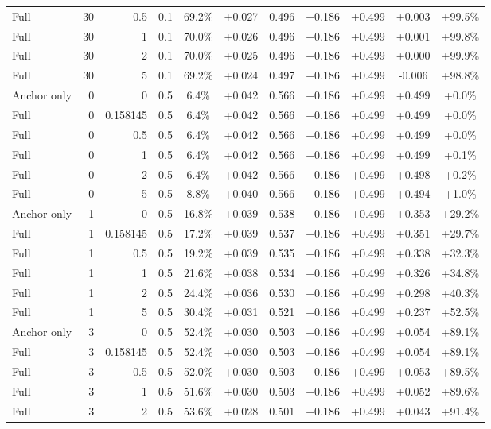 \begin{table}[htbp]
\begin{tabular}{lrrrccccccc}
Full & 30 & 0.5 & 0.1 & 69.2\% & +0.027 & 0.496 & +0.186 & +0.499 & +0.003 & +99.5\% \\
Full & 30 & 1 & 0.1 & 70.0\% & +0.026 & 0.496 & +0.186 & +0.499 & +0.001 & +99.8\% \\
Full & 30 & 2 & 0.1 & 70.0\% & +0.025 & 0.496 & +0.186 & +0.499 & +0.000 & +99.9\% \\
Full & 30 & 5 & 0.1 & 69.2\% & +0.024 & 0.497 & +0.186 & +0.499 & -0.006 & +98.8\% \\
Anchor only & 0 & 0 & 0.5 & 6.4\% & +0.042 & 0.566 & +0.186 & +0.499 & +0.499 & +0.0\% \\
Full & 0 & 0.158145 & 0.5 & 6.4\% & +0.042 & 0.566 & +0.186 & +0.499 & +0.499 & +0.0\% \\
Full & 0 & 0.5 & 0.5 & 6.4\% & +0.042 & 0.566 & +0.186 & +0.499 & +0.499 & +0.0\% \\
Full & 0 & 1 & 0.5 & 6.4\% & +0.042 & 0.566 & +0.186 & +0.499 & +0.499 & +0.1\% \\
Full & 0 & 2 & 0.5 & 6.4\% & +0.042 & 0.566 & +0.186 & +0.499 & +0.498 & +0.2\% \\
Full & 0 & 5 & 0.5 & 8.8\% & +0.040 & 0.566 & +0.186 & +0.499 & +0.494 & +1.0\% \\
Anchor only & 1 & 0 & 0.5 & 16.8\% & +0.039 & 0.538 & +0.186 & +0.499 & +0.353 & +29.2\% \\
Full & 1 & 0.158145 & 0.5 & 17.2\% & +0.039 & 0.537 & +0.186 & +0.499 & +0.351 & +29.7\% \\
Full & 1 & 0.5 & 0.5 & 19.2\% & +0.039 & 0.535 & +0.186 & +0.499 & +0.338 & +32.3\% \\
Full & 1 & 1 & 0.5 & 21.6\% & +0.038 & 0.534 & +0.186 & +0.499 & +0.326 & +34.8\% \\
Full & 1 & 2 & 0.5 & 24.4\% & +0.036 & 0.530 & +0.186 & +0.499 & +0.298 & +40.3\% \\
Full & 1 & 5 & 0.5 & 30.4\% & +0.031 & 0.521 & +0.186 & +0.499 & +0.237 & +52.5\% \\
Anchor only & 3 & 0 & 0.5 & 52.4\% & +0.030 & 0.503 & +0.186 & +0.499 & +0.054 & +89.1\% \\
Full & 3 & 0.158145 & 0.5 & 52.4\% & +0.030 & 0.503 & +0.186 & +0.499 & +0.054 & +89.1\% \\
Full & 3 & 0.5 & 0.5 & 52.0\% & +0.030 & 0.503 & +0.186 & +0.499 & +0.053 & +89.5\% \\
Full & 3 & 1 & 0.5 & 51.6\% & +0.030 & 0.503 & +0.186 & +0.499 & +0.052 & +89.6\% \\
Full & 3 & 2 & 0.5 & 53.6\% & +0.028 & 0.501 & +0.186 & +0.499 & +0.043 & +91.4\% \\

\end{tabular}
\end{table}

